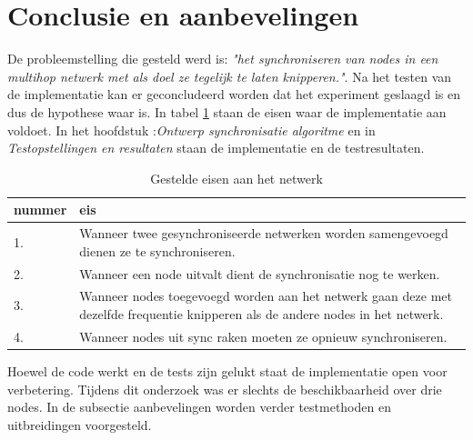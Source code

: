 \documentclass{article}
\begin{document}
\section{Conclusie en aanbevelingen}
De probleemstelling die gesteld werd is: \textit{"het synchroniseren van nodes in een multihop netwerk met als doel ze tegelijk te laten knipperen."}. Na het testen van de implementatie kan er geconcludeerd worden dat het experiment geslaagd is en dus de hypothese waar is. In tabel \ref{tab: Gestelde eisen} staan de eisen waar de implementatie aan voldoet. In het hoofdstuk :\textit{Ontwerp synchronisatie algoritme} en in \textit{Testopstellingen en resultaten} staan de implementatie en de testresultaten. 
\begin{table}[h]
	\centering\caption{Gestelde eisen aan het netwerk}
	\label{tab: Gestelde eisen}
	\begin{tabular}{l|p{10cm}}
	\textbf{nummer} & \textbf{eis} \\ \hline\hline
	1. & Wanneer twee gesynchroniseerde netwerken worden samengevoegd 
	dienen ze te synchroniseren. \\ \hline
	2. & Wanneer een node uitvalt dient de synchronisatie 
	nog te werken. \\ \hline
	3. & Wanneer nodes toegevoegd worden aan het netwerk gaan deze met dezelfde
	 frequentie knipperen als de andere nodes in het netwerk.\\ \hline
	4. & Wanneer nodes uit sync raken moeten ze opnieuw synchroniseren. \\ \hline
	\end{tabular}
\end{table}
\newline
Hoewel de code werkt en de tests zijn gelukt staat de implementatie open voor verbetering. Tijdens dit onderzoek was er slechts de beschikbaarheid over drie nodes. In de subsectie aanbevelingen worden verder testmethoden en uitbreidingen voorgesteld. 
\end{document}
